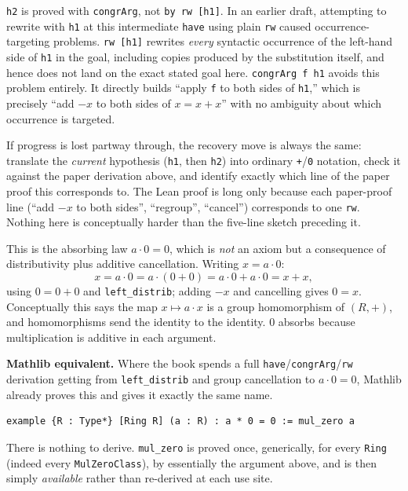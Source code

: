 \texttt{h2} is proved with \texttt{congrArg}, not \texttt{by rw [h1]}. In an earlier draft, attempting to rewrite with \texttt{h1} at this intermediate \texttt{have} using plain \texttt{rw} caused occurrence-targeting problems. \texttt{rw [h1]} rewrites \emph{every} syntactic occurrence of the left-hand side of \texttt{h1} in the goal, including copies produced by the substitution itself, and hence does not land on the exact stated goal here. \texttt{congrArg f h1} avoids this problem entirely. It directly builds ``apply \texttt{f} to both sides of \texttt{h1},'' which is precisely ``add \(-x\) to both sides of \(x = x+x\)'' with no ambiguity about which occurrence is targeted.

If progress is lost partway through, the recovery move is always the same: translate the \emph{current} hypothesis (\texttt{h1}, then \texttt{h2}) into ordinary \texttt{+}/\texttt{0} notation, check it against the paper derivation above, and identify exactly which line of the paper proof this corresponds to. The Lean proof is long only because each paper-proof line (``add \(-x\) to both sides'', ``regroup'', ``cancel'') corresponds to one \texttt{rw}. Nothing here is conceptually harder than the five-line sketch preceding it.

\begin{mathreading}

This is the absorbing law \(a\cdot 0 = 0\), which is \emph{not} an axiom but a consequence of distributivity plus additive cancellation. Writing \(x = a\cdot 0\): \[
x = a\cdot 0 = a\cdot(0+0) = a\cdot 0 + a\cdot 0 = x + x,
\] using \(0 = 0+0\) and \texttt{left\_\allowbreak{}distrib}; adding \(-x\) and cancelling gives \(0 = x\). Conceptually this says the map \(x \mapsto a\cdot x\) is a group homomorphism of \((R,+)\), and homomorphisms send the identity to the identity. \(0\) absorbs because multiplication is additive in each argument.

\end{mathreading}

\textbf{Mathlib equivalent.} Where the book spends a full \texttt{have}/\texttt{congrArg}/\texttt{rw} derivation getting from \texttt{left\_\allowbreak{}distrib} and group cancellation to \(a\cdot 0=0\), Mathlib already proves this and gives it exactly the same name.

\begin{lstlisting}
example {R : Type*} [Ring R] (a : R) : a * 0 = 0 := mul_zero a
\end{lstlisting}

There is nothing to derive. \texttt{mul\_\allowbreak{}zero} is proved once, generically, for every \texttt{Ring} (indeed every \texttt{MulZeroClass}), by essentially the argument above, and is then simply \emph{available} rather than re-derived at each use site.
